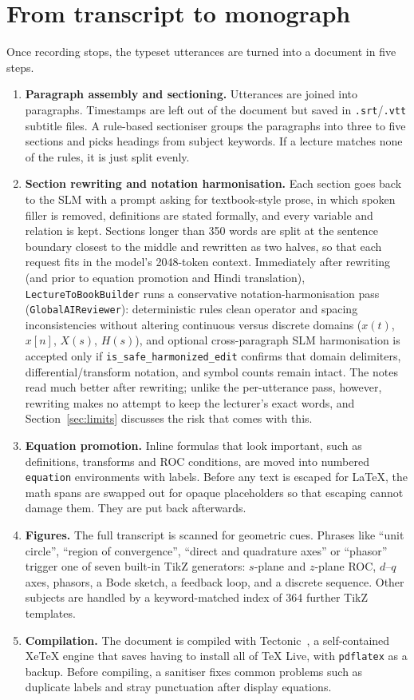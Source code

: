 \documentclass[11pt,a4paper,oneside]{report}
\theoremstyle{definition}
\newcommand{\code}[1]{\texttt{\small #1}}
\begin{document}
\section{From transcript to monograph}
\label{sec:book}
Once recording stops, the typeset utterances are turned into a document in five steps.
\begin{enumerate}
  \item \textbf{Paragraph assembly and sectioning.} Utterances are joined into paragraphs. Timestamps are left out of the document but saved in \code{.srt}/\code{.vtt} subtitle files. A rule-based sectioniser groups the paragraphs into three to five sections and picks headings from subject keywords. If a lecture matches none of the rules, it is just split evenly.
  \item \textbf{Section rewriting and notation harmonisation.} Each section goes back to the SLM with a prompt asking for textbook-style prose, in which spoken filler is removed, definitions are stated formally, and every variable and relation is kept. Sections longer than 350 words are split at the sentence boundary closest to the middle and rewritten as two halves, so that each request fits in the model's 2048-token context. Immediately after rewriting (and prior to equation promotion and Hindi translation), \code{LectureToBookBuilder} runs a conservative notation-harmonisation pass (\code{GlobalAIReviewer}): deterministic rules clean operator and spacing inconsistencies without altering continuous versus discrete domains ($x(t)$, $x[n]$, $X(s)$, $H(s)$), and optional cross-paragraph SLM harmonisation is accepted only if \code{is\_safe\_harmonized\_edit} confirms that domain delimiters, differential/transform notation, and symbol counts remain intact. The notes read much better after rewriting; unlike the per-utterance pass, however, rewriting makes no attempt to keep the lecturer's exact words, and Section~\ref{sec:limits} discusses the risk that comes with this.
  \item \textbf{Equation promotion.} Inline formulas that look important, such as definitions, transforms and ROC conditions, are moved into numbered \code{equation} environments with labels. Before any text is escaped for LaTeX, the math spans are swapped out for opaque placeholders so that escaping cannot damage them. They are put back afterwards.
  \item \textbf{Figures.} The full transcript is scanned for geometric cues. Phrases like ``unit circle'', ``region of convergence'', ``direct and quadrature axes'' or ``phasor'' trigger one of seven built-in TikZ generators: $s$-plane and $z$-plane ROC, $d$--$q$ axes, phasors, a Bode sketch, a feedback loop, and a discrete sequence. Other subjects are handled by a keyword-matched index of 364 further TikZ templates.
  \item \textbf{Compilation.} The document is compiled with Tectonic~\cite{tectonic}, a self-contained XeTeX engine that saves having to install all of TeX Live, with \texttt{pdflatex} as a backup. Before compiling, a sanitiser fixes common problems such as duplicate labels and stray punctuation after display equations.
\end{enumerate}
\end{document}

